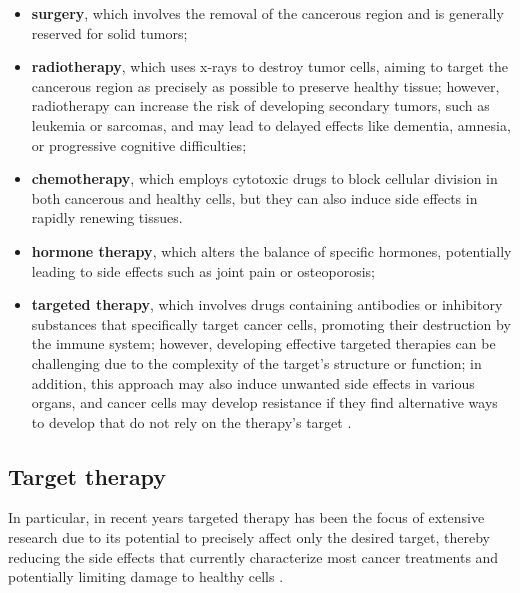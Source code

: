 \begin{itemize}
    \item \textbf{surgery}, which involves the removal of the cancerous region and is generally reserved for solid tumors;
    \item \textbf{radiotherapy}, which uses x-rays to destroy tumor cells, aiming to target the cancerous region as precisely as possible to preserve healthy tissue; however, radiotherapy can increase the risk of developing secondary tumors, such as leukemia or sarcomas, and may lead to delayed effects like dementia, amnesia, or progressive cognitive difficulties;
    \item \textbf{chemotherapy}, which employs cytotoxic drugs to block cellular division in both cancerous and healthy cells, but they can also induce side effects in rapidly renewing tissues.
    \item \textbf{hormone therapy}, which alters the balance of specific hormones, potentially leading to side effects such as joint pain or osteoporosis;
    \item \textbf{targeted therapy}, which involves drugs containing antibodies or inhibitory substances that specifically target cancer cells, promoting their destruction by the immune system; however, developing effective targeted therapies can be challenging due to the complexity of the target's structure or function; in addition, this approach may also induce unwanted side effects in various organs, and cancer cells may develop resistance if they find alternative ways to develop that do not rely on the therapy's target \cite{target_therapy1} . \end{itemize}

\subsection{Target therapy}

In particular, in recent years targeted therapy has been the focus of extensive research due to its potential to precisely affect only the desired target, thereby reducing the side effects that currently characterize most cancer treatments and potentially limiting damage to healthy cells \cite{target_therapy3}. 

\cleardoublepage
